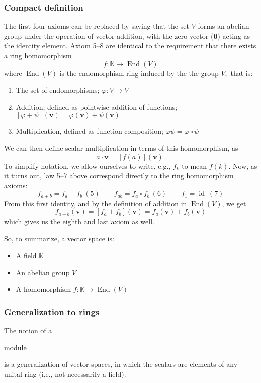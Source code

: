 \documentclass{article}
\DeclareMathOperator{\End}{End}
\DeclareMathOperator{\id}{id}
\newenvironment{itemized}{
\begin{itemize}
\setlength{\itemsep}{0pt}
\setlength{\parskip}{0pt}
\setlength{\parsep}{0pt}
}{\end{itemize}}
\newenvironment{enumerated}{
\begin{enumerate}
\setlength{\itemsep}{0pt}
\setlength{\parskip}{0pt}
\setlength{\parsep}{0pt}
}{\end{enumerate}}
\renewcommand{\vec}[1]{\mathbf{#1}}
\begin{document}
\subsubsection*{Compact definition}

The first four axioms can be replaced by saying that the set $V$ forms an abelian group under the operation of vector addition, with the zero vector ($\vec{0}$) acting as the identity element.
Axiom 5--8 are identical to the requirement that there exists a ring homomorphism
$$ f : \mathbb{K} \rightarrow \End(V) $$
where $\End(V)$ is the endomorphism ring induced by the the group $V,$ that is:
\begin{enumerated}
  \item The set of endomorphisms; $\varphi : V \rightarrow V$
  \item Addition, defined as pointwise addition of functions; $ \left[\varphi + \psi\right](\vec{v}) = \varphi(\vec{v}) + \psi(\vec{v})$
  \item Multiplication, defined as function composition; $ \varphi\psi = \varphi \circ \psi$
\end{enumerated}
We can then define scalar multiplication in terms of this homomorphism, as
$$ a \cdot \vec{v} = [f(a)](\vec{v}). $$
To simplify notation, we allow ourselves to write, e.g., $f_k$ to mean $f(k)$.
Now, as it turns out, law 5--7 above correspond directly to the ring homomorphism axioms:
$$
f_{a + b} = f_a + f_b \ (5) \quad \quad
f_{ab} = f_a \circ f_b \ (6) \quad \quad
f_1 = \id \ (7)
$$
From this first identity, and by the definition of addition in $\End(V)$, we get
$$ f_{a + b}(\vec{v}) = [f_a + f_b](\vec{v}) = f_a(\vec{v}) + f_b(\vec{v}) $$
which gives us the eighth and last axiom as well.

So, to summarize, a vector space is:
\begin{itemized}
  \item A field $\mathbb{K}$
  \item An abelian group $V$
  \item A homomorphism $f : \mathbb{K} \rightarrow \End(V)$
\end{itemized}

\subsubsection*{Generalization to rings}
The notion of a \begin{em}module\end{em} is a generalization of vector spaces, in which the scalars are elements of any unital ring (i.e., not necessarily a field).
\end{document}
